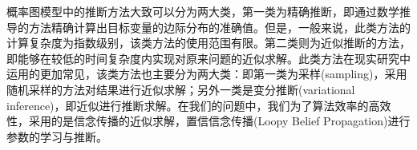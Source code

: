 概率图模型中的推断方法大致可以分为两大类，第一类为精确推断，即通过数学推导的方法精确计算出目标变量的边际分布的准确值。但是，一般来说，此类方法的计算复杂度为指数级别，该类方法的使用范围有限。第二类则为近似推断的方法，即能够在较低的时间复杂度内实现对原来问题的近似求解。此类方法在现实研究中运用的更加常见，该类方法也主要分为两大类：即第一类为采样(sampling)，采用随机采样的方法对结果进行近似求解；另外一类是变分推断(variational inference)，即近似进行推断求解。在我们的问题中，我们为了算法效率的高效性，采用的是信念传播的近似求解，置信信念传播(Loopy Belief Propagation)进行参数的学习与推断。










